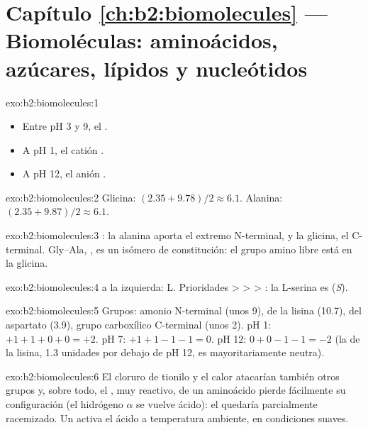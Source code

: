 \section*{Capítulo \ref{ch:b2:biomolecules} --- Biomoléculas: aminoácidos, azúcares, lípidos y nucleótidos}

\begin{solution}{exo:b2:biomolecules:1}
\begin{itemize}
  \item Entre pH 3 y 9, el  .
  \item A pH 1, el catión .
  \item A pH 12, el anión .
\end{itemize}
\end{solution}

\begin{solution}{exo:b2:biomolecules:2}
Glicina: $(2.35 + 9.78)/2 \approx 6.1$. Alanina: $(2.35 + 9.87)/2 \approx 6.1$.
\end{solution}

\begin{solution}{exo:b2:biomolecules:3}
: la alanina aporta el extremo N-terminal, y la glicina, el C-terminal. Gly--Ala,
, es un isómero de constitución: el grupo amino libre está en la glicina.
\end{solution}

\begin{solution}{exo:b2:biomolecules:4}
 a la izquierda: L. Prioridades  >  >  > : la L-serina es
(\textit{S}).
\end{solution}

\begin{solution}{exo:b2:biomolecules:5}
Grupos: amonio N-terminal (unos 9),  de la lisina (10.7),  del aspartato (3.9),
grupo carboxílico C-terminal (unos 2). pH 1: $+1 +1 + 0 + 0 = +2$. pH 7: $+1 +1 -1 -1 = 0$. pH 12:
$0 + 0 - 1 - 1 = -2$ (la  de la lisina, 1.3 unidades por debajo de pH 12, es mayoritariamente neutra).
\end{solution}

\begin{solution}{exo:b2:biomolecules:6}
El cloruro de tionilo y el calor atacarían también otros grupos y, sobre todo, el , muy reactivo,
de un aminoácido pierde fácilmente su configuración (el hidrógeno $\alpha$ se vuelve ácido): el  quedaría
parcialmente racemizado. Un  activa el ácido a temperatura ambiente, en condiciones suaves.
\end{solution}

